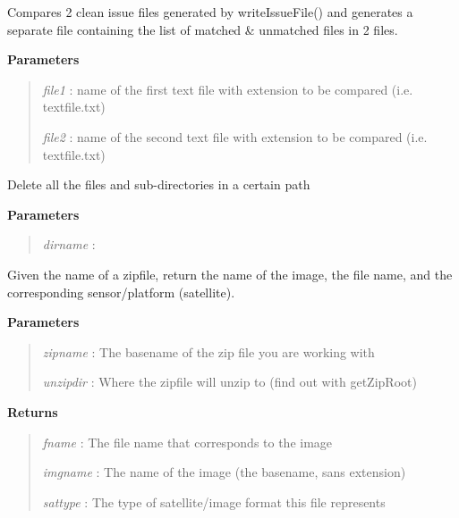 \documentclass[letterpaper,10pt,openany,oneside]{sphinxmanual}
\begin{document}

\begin{fulllineitems}
\label{code:Util.compareIssueFiles}
Compares 2 clean issue files generated by writeIssueFile() and
generates a separate file containing the list of matched \& unmatched files in 2 files.

\textbf{Parameters}
\begin{quote}

\emph{file1} : name of the first text file with extension to be compared (i.e. textfile.txt)

\emph{file2} : name of the second text file with extension to be compared (i.e. textfile.txt)
\end{quote}

\end{fulllineitems}


\begin{fulllineitems}
\label{code:Util.deltree}
Delete all the files and sub-directories in a certain path

\textbf{Parameters}
\begin{quote}

\emph{dirname}   :
\end{quote}

\end{fulllineitems}


\begin{fulllineitems}
\label{code:Util.getFilename}
Given the name of a zipfile, return the name of the image,
the file name, and the corresponding sensor/platform (satellite).

\textbf{Parameters}
\begin{quote}

\emph{zipname}  : The basename of the zip file you are working with

\emph{unzipdir} : Where the zipfile will unzip to (find out with getZipRoot)
\end{quote}

\textbf{Returns}
\begin{quote}

\emph{fname}    :  The file name that corresponds to the image

\emph{imgname}  : The name of the image (the basename, sans extension)

\emph{sattype}  : The type of satellite/image format this file represents
\end{quote}

\end{fulllineitems}
\end{document}
